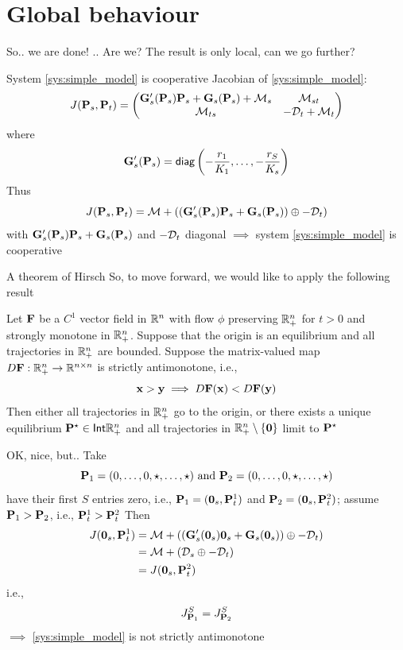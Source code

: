 \documentclass[aspectratio=169]{beamer}
\begin{document}
\section{Global behaviour}
\begin{frame}{So..}
	we are done!
	\vfill
	.. Are we? The result is only local, can we go further?
\end{frame}

\begin{frame}{System \eqref{sys:simple_model} is cooperative}
	Jacobian of \eqref{sys:simple_model}:
	\begin{equation}\label{eq:Jacobian_anywhere}
	J(\mathbf{P}_s,\mathbf{P}_t) = 
	\begin{pmatrix}
	\mathbf{G}_s'(\mathbf{P}_s)\mathbf{P}_s+\mathbf{G}_s(\mathbf{P}_s)+\mathcal{M}_s & \mathcal{M}_{st} \\
	\mathcal{M}_{ts} & -\mathcal{D}_t+\mathcal{M}_t
	\end{pmatrix}
	\end{equation}
	where
	\[
	\mathbf{G}_s'(\mathbf{P}_s) = \mathsf{diag} \left(-\frac{r_1}{K_1},\ldots,-\frac{r_S}{K_s}\right)
	\]
	\vfill
	Thus
	\[
	J(\mathbf{P}_s,\mathbf{P}_t) = \mathcal{M}+ \left((\mathbf{G}_s'(\mathbf{P}_s)\mathbf{P}_s+\mathbf{G}_s(\mathbf{P}_s))\oplus -\mathcal{D}_t\right)
	\]
	with
	$\mathbf{G}_s'(\mathbf{P}_s)\mathbf{P}_s+\mathbf{G}_s(\mathbf{P}_s)$ and $-\mathcal{D}_t$ diagonal
	\vfill
	$\implies$ system \eqref{sys:simple_model} is cooperative
\end{frame}


\begin{frame}{A theorem of Hirsch}
	So, to move forward, we would like to apply the following result
	\vfill
	\begin{theorem}
		Let $\mathbf{F}$ be a $C^1$ vector field in $\mathbb{R}^n$ with flow $\phi$ preserving $\mathbb{R}_+^n$ for $t>0$ and strongly monotone in $\mathbb{R}_+^n$. 
		Suppose that the origin is an equilibrium and all trajectories in $\mathbb{R}_+^n$ are bounded. Suppose the matrix-valued map $D\mathbf{F}:\mathbb{R}_+^n\to \mathbb{R}^{n\times n}$ is strictly antimonotone, i.e., 
		\[
		\mathbf{x}>\mathbf{y}\implies D\mathbf{F}(\mathbf{x})<D\mathbf{F}(\mathbf{y})
		\]
		\vskip0.5cm
		Then either all trajectories in $\mathbb{R}_+^n$ go to the origin, or there exists a unique equilibrium $\mathbf{P}^\star\in\mathsf{Int}\mathbb{R}_+^n$ and all trajectories in $\IR_+^n\setminus\{\b0\}$ limit to $\mathbf{P}^\star$
	\end{theorem}
\end{frame}

\begin{frame}{OK, nice, but..}
	Take
	\[
	\mathbf{P}_1 = (0,\ldots,0,\star,\ldots,\star) \textrm{ and }
	\mathbf{P}_2 = (0,\ldots,0,\star,\ldots,\star)
	\]
	have their first $S$ entries zero, i.e., $\bP_1=(\b0_s,\bP_t^1)$ and $\bP_2=(\b0_s,\bP_t^2)$; assume $\mathbf{P}_1>\mathbf{P}_2$, i.e., $\mathbf{P}_t^1>\mathbf{P}_t^2$
	\vfill
	Then
	\begin{align*}
	J(\b0_s,\bP_t^1) &= \M+ \left((\bG_s'(\b0_s)\b0_s+\bG_s(\b0_s))\oplus -\D_t\right) \\
	&= \M+\left(\D_s\oplus -\D_t\right) \\
	&= J(\b0_s,\bP_t^2)
	\end{align*}
	i.e.,
	\[
	J^S_{\mathbf{P}_1}=J^S_{\mathbf{P}_2}
	\]
	\vfill
	$\implies$ \eqref{sys:simple_model} is not strictly antimonotone
\end{frame}
\end{document}
